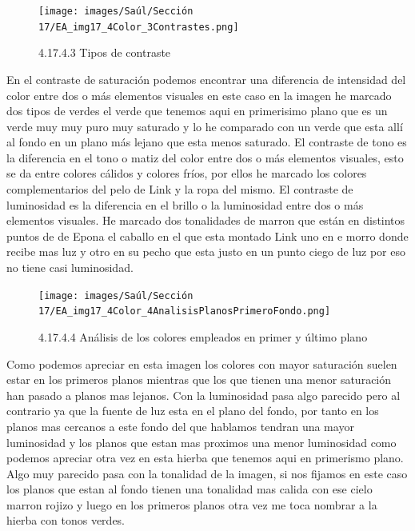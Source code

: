 \documentclass[12pt]{article}
\begin{document}
        \begin{figure}[H]
          \centering
          \texttt{[image: images/Saúl/Sección 17/EA\_img17\_4Color\_3Contrastes.png]}
          \caption{\small 4.17.4.3 Tipos de contraste}
        \end{figure}
        En el contraste de saturación podemos encontrar una diferencia de intensidad del color entre dos o más elementos visuales en este caso en la imagen he marcado dos tipos de verdes el verde que tenemos aqui en primerisimo plano que es un verde muy muy puro muy saturado y lo he comparado con un verde que esta allí al fondo en un plano más lejano que esta menos saturado. El contraste de tono es la diferencia en el tono o matiz del color entre dos o más elementos visuales, esto se da entre colores cálidos y colores fríos, por ellos he marcado los colores complementarios del pelo de Link y la ropa del mismo. El contraste de luminosidad es la diferencia en el brillo o la luminosidad entre dos o más elementos visuales. He marcado dos tonalidades de marron que están en distintos puntos de de Epona el caballo en el que esta montado Link uno en e morro donde recibe mas luz y otro en su pecho que esta justo en un punto ciego de luz por eso no tiene casi luminosidad.



        \begin{figure}[H]
          \centering
          \texttt{[image: images/Saúl/Sección 17/EA\_img17\_4Color\_4AnalisisPlanosPrimeroFondo.png]}
          \caption{\small 4.17.4.4 Análisis de los colores empleados en primer y último plano}
        \end{figure}
        Como podemos apreciar en esta imagen los colores con mayor saturación suelen estar en los primeros planos mientras que los que tienen una menor saturación han pasado a planos mas lejanos. Con la luminosidad pasa algo parecido pero al contrario ya que la fuente de luz esta en el plano del fondo, por tanto en los planos mas cercanos a este fondo del que hablamos tendran una mayor luminosidad y los planos que estan mas proximos una menor luminosidad como podemos apreciar otra vez en esta hierba que tenemos aqui en primerismo plano. Algo muy parecido pasa con la tonalidad de la imagen, si nos fijamos en este caso los planos que estan al fondo tienen una tonalidad mas calida con ese cielo marron rojizo y luego en los primeros planos otra vez me toca nombrar a la hierba con tonos verdes.

        \newpage

\end{document}
